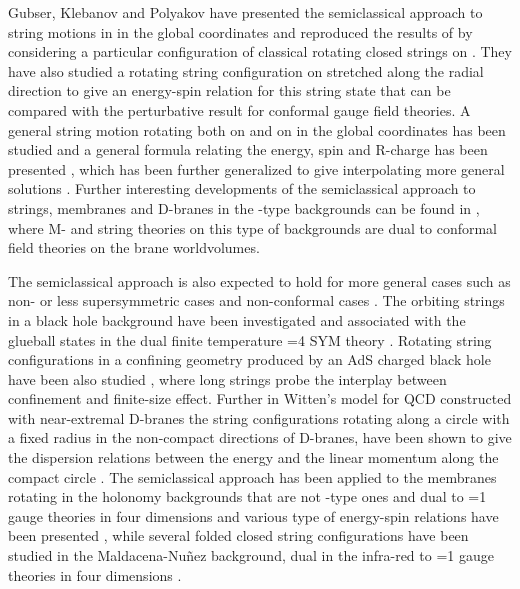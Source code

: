 \documentclass[12pt,a4paper]{article}
\begin{document}
Gubser, Klebanov and Polyakov \cite{SIA} have presented the semiclassical
approach to string motions in \coordHE{} in the global coordinates
and reproduced the results of \cite{BMN} by considering a particular 
configuration of classical rotating closed strings on \coordHE{}.
They have also studied a rotating string configuration on \coordHE{}
stretched along the radial direction to give an energy-spin relation for
this string state that can be compared with the perturbative result for
conformal gauge field theories. A general string motion rotating both on
\coordHE{} and on \coordHE{} in the global coordinates has been studied and a 
general formula relating the energy, spin and R-charge has been 
presented \cite{FT}, which has been 
further generalized to give interpolating
more general solutions \cite{JR}. Further interesting developments of the
semiclassical approach to strings, membranes and D-branes in the 
\coordHE{}-type backgrounds can be found in
\cite{MSW,AG,JAM,AT,RV,LO,PO}, where
M- and string theories on this type of backgrounds are dual to 
conformal field theories on the brane worldvolumes.

The semiclassical approach is also expected to hold for more general cases
such as non- or less supersymmetric cases and non-conformal 
cases  \cite{ABP,AT,AJA,AM,HN,GZ,PT}.
The orbiting strings in a \coordHE{} black hole background have been 
investigated and associated with the glueball states in the dual
finite temperature \coordHE{}=4 SYM theory \cite{ABP}.
Rotating string configurations in a confining geometry produced by an 
AdS charged black hole have been also studied \cite{AJA}, 
where long strings probe the interplay between confinement and 
finite-size effect. Further in Witten's model for QCD constructed with
near-extremal D\coordHE{}-branes the string configurations rotating along a 
circle with a fixed radius in the non-compact directions of  
D\coordHE{}-branes, have been shown to give the dispersion relations between the
energy and the linear momentum along the compact circle \cite{AJA,AM}. 
The semiclassical approach has been applied to the membranes rotating  
in the \coordHE{} holonomy backgrounds that are not \coordHE{}-type ones
and dual to \coordHE{}=1 gauge theories in four dimensions and 
various type of energy-spin relations have been presented \cite{HN},
while several folded closed string configurations have been studied
in the Maldacena-Nu\~nez background, dual in the infra-red to 
\coordHE{}=1 gauge theories in four dimensions \cite{PT}.
\end{document}
